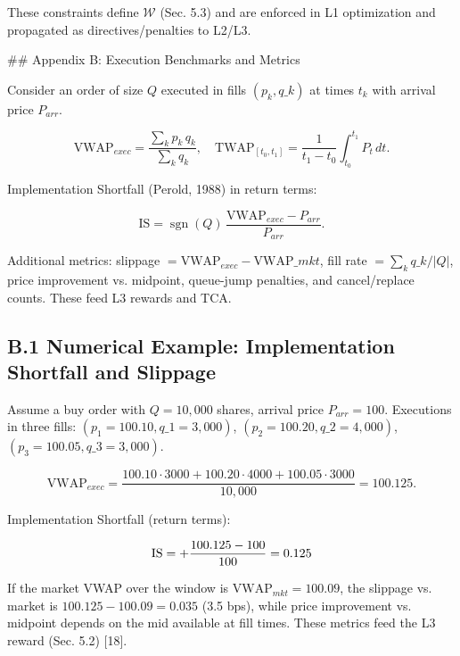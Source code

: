 \documentclass[11pt]{article}
\begin{document}
These constraints define $\mathcal{W}$ (Sec. 5.3) and are enforced in L1 optimization and propagated as directives/penalties to L2/L3.

\#\# Appendix B: Execution Benchmarks and Metrics

Consider an order of size $Q$ executed in fills $(p_k, q\_k)$ at times $t_k$ with arrival price $P_{arr}$.

\begin{equation}
\mathrm{VWAP}_{exec} = \frac{\sum_k p_k\,q_k}{\sum_k q_k},\quad \mathrm{TWAP}_{[t_0,t_1]} = \frac{1}{t_1-t_0}\int_{t_0}^{t_1} P_t\,dt.
\end{equation}

Implementation Shortfall (Perold, 1988) in return terms:

\begin{equation}
\mathrm{IS} = \operatorname{sgn}(Q)\,\frac{\mathrm{VWAP}_{exec}-P_{arr}}{P_{arr}}.
\end{equation}

Additional metrics: slippage $= \mathrm{VWAP}_{exec}-\mathrm{VWAP}\_{mkt}$, fill rate $= \sum_k q\_k/|Q|$, price improvement vs. midpoint, queue-jump penalties, and cancel/replace counts. These feed L3 rewards and TCA.

\subsection{B.1 Numerical Example: Implementation Shortfall and Slippage}

Assume a buy order with $Q=10,000$ shares, arrival price $P_{arr}=100$. Executions in three fills: $(p_1=100.10, q\_1=3,000)$, $(p_2=100.20, q\_2=4,000)$, $(p_3=100.05, q\_3=3,000)$.

\begin{equation}
\mathrm{VWAP}_{exec} = \frac{100.10\cdot 3000 + 100.20\cdot 4000 + 100.05\cdot 3000}{10,000} = 100.125.
\end{equation}

Implementation Shortfall (return terms):

\begin{equation}
\mathrm{IS} = +\frac{100.125-100}{100} = 0.125\\%
\end{equation}

If the market VWAP over the window is $\mathrm{VWAP}_{mkt}=100.09$, the slippage vs. market is $100.125-100.09=0.035$ (3.5 bps), while price improvement vs. midpoint depends on the mid available at fill times. These metrics feed the L3 reward (Sec. 5.2) [18].
\end{document}
